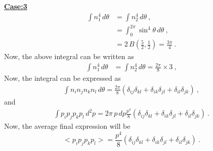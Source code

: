 \documentclass[amsmath,amssymb,aps,prb]{revtex4-2}
\begin{document}
    \underline{\textbf{Case:3}}\\
    \begin{align*}
    \int n_1^4\, d\theta &=  \int n_2^4\, d\theta~, \\
    & =  \int_0^{2 \pi} \sin^4{\theta} \, d\theta~,\\ 
    &= 2 \, B\left( \frac{5}{2}, \frac{1}{2}\right) = \frac{3 \pi}{4}~.
    \end{align*}
    Now, the above integral can be written as
    \begin{align*}
     \int n_1^4\, d\theta &=  \int n_2^4\, d\theta = \frac{2 \pi}{8}\times 3~,
    \end{align*}
    Now, the integral can be expressed as
    \begin{align}
    \int  n_i n_j n_k n_l \,d\theta = \frac{2\pi }{8} \left( \delta_{ij}\delta_{kl} + \delta_{ik}\delta_{jl} + \delta_{il}\delta_{jk}\right)~,
    \end{align}
    and
    \begin{align*}
     \int p_i p_j p_k p_l \, d^2p = 2\pi \, p\,dp \frac{p^4}{8}\left( \delta_{ij}\delta_{kl} + \delta_{ik}\delta_{jl} + \delta_{il}\delta_{jk}\right)~.
    \end{align*}
    Now, the average final expression will be
    \begin{equation}
    <p_i p_j p_k p_l> = \frac{p^4}{8}\left( \delta_{ij}\delta_{kl} + \delta_{ik}\delta_{jl} + \delta_{il}\delta_{jk}\right)~.
    \end{equation}
%
%	
    
%
    
\end{document}
